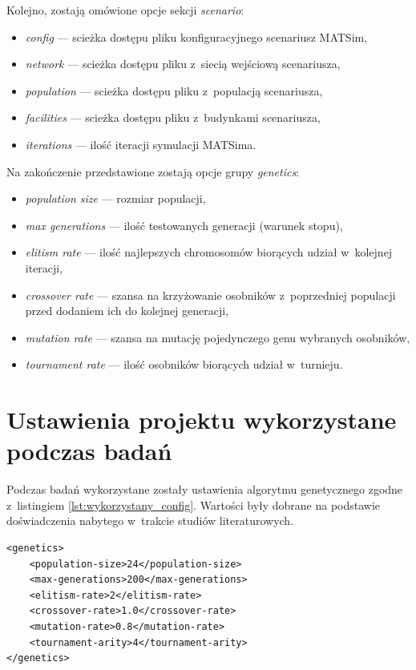 \documentclass[twoside,12pt]{report}
\begin{document}
Kolejno, zostają omówione opcje sekcji \textit{scenario}:
\begin{itemize}
\item \textit{config} --- scieżka dostępu pliku konfiguracyjnego scenariusz MATSim,
\item \textit{network} --- scieżka dostępu pliku z~siecią wejściową scenariusza,
\item \textit{population} --- scieżka dostępu pliku z~populacją scenariusza,
\item \textit{facilities} --- scieżka dostępu pliku z~budynkami scenariusza,
\item \textit{iterations} --- ilość iteracji symulacji MATSima.
\end{itemize}

Na zakończenie przedstawione zostają opcje grupy \textit{genetics}:
\begin{itemize}
\item \textit{population size} --- rozmiar populacji,
\item \textit{max generations} --- ilość testowanych generacji (warunek stopu),
\item \textit{elitism rate} --- ilość najlepszych chromosomów biorących udział w~kolejnej iteracji,
\item \textit{crossover rate} --- szansa na krzyżowanie osobników z~poprzedniej populacji przed dodaniem ich do kolejnej generacji,
\item \textit{mutation rate} --- szansa na mutację pojedynczego genu wybranych osobników,
\item \textit{tournament rate} --- ilość osobników biorących udział w~turnieju.
\end{itemize}

\section{Ustawienia projektu wykorzystane podczas badań}

Podczas badań wykorzystane zostały ustawienia algorytmu genetycznego zgodne z~listingiem \ref{lst:wykorzystany_config}. Wartości były dobrane na podstawie doświadczenia nabytego w~trakcie studiów literaturowych. 
	
\begin{lstlisting}[caption=Ustawienia algorytmu genetycznego podczas badań, label=lst:wykorzystany_config]
<genetics>
	<population-size>24</population-size>
	<max-generations>200</max-generations>
	<elitism-rate>2</elitism-rate>
	<crossover-rate>1.0</crossover-rate>
	<mutation-rate>0.8</mutation-rate>
	<tournament-arity>4</tournament-arity>
</genetics>
\end{lstlisting}
\end{document}
